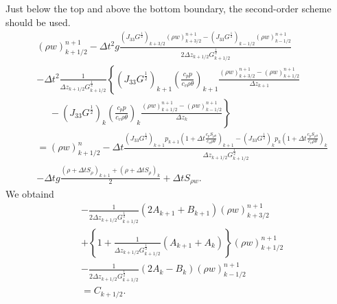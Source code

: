 Just below the top and above the bottom boundary, the second-order scheme should be used.
\begin{align}
&
  (\rho w)_{k+1/2}^{n+1}
  - \Delta t^2 g\frac{(J_{33}G^{\frac{1}{2}})_{k+3/2}(\rho w)_{k+3/2}^{n+1}-(J_{33}G^{\frac{1}{2}})_{k-1/2}(\rho w)_{k-1/2}^{n+1}}{2\Delta z_{k+1/2} G^{\frac{1}{2}}_{k+1/2}}  \nonumber\\ &
  -\Delta t^2 \frac{1}{\Delta z_{k+1/2} G^{\frac{1}{2}}_{k+1/2}}\left\{
  (J_{33}G^{\frac{1}{2}})_{k+1} \left(\frac{c_pp}{c_v\rho\theta}\right)_{k+1}\frac{(\rho w)_{k+3/2}^{n+1}-(\rho w)_{k+1/2}^{n+1}}{\Delta z_{k+1}}
  \right. \nonumber\\ & \left.\:\:\:\:\:\:
  -(J_{33}G^{\frac{1}{2}})_k \left(\frac{c_pp}{c_v\rho\theta}\right)_k\frac{(\rho w)_{k+1/2}^{n+1}-(\rho w)_{k-1/2}^{n+1}}{\Delta z_k} \right\} \nonumber\\
  &=
  (\rho w)_{k+1/2}^n -\Delta t\frac{
  (J_{33}G^{\frac{1}{2}})_{k+1} p_{k+1}\left(1+\Delta t\frac{c_pS_{\rho\theta}}{c_v\rho\theta}\right)_{k+1}
  - (J_{33}G^{\frac{1}{2}})_k p_k\left(1+\Delta t\frac{c_pS_{\rho\theta}}{c_v\rho\theta}\right)_k}{\Delta z_{k+1/2} G^{\frac{1}{2}}_{k+1/2}} \nonumber\\ &
  -\Delta t g \frac{(\rho+\Delta t S_\rho)_{k+1}+(\rho+\Delta t S_\rho)_k}{2} + \Delta t S_{\rho w}.
\end{align}
We obtaind
\begin{align}
  &- \frac{1}{2\Delta z_{k+1/2} G^{\frac{1}{2}}_{k+1/2}}(2A_{k+1} + B_{k+1}) (\rho w)_{k+3/2}^{n+1} \\
  &+ \left\{ 1 + \frac{1}{\Delta z_{k+1/2} G^{\frac{1}{2}}_{k+1/2}}(A_{k+1} + A_k)  \right\}(\rho w)_{k+1/2}^{n+1} \\
  &- \frac{1}{2\Delta z_{k+1/2} G^{\frac{1}{2}}_{k+1/2}}(2A_k -B_k) (\rho w)_{k-1/2}^{n+1} \\
  &= C_{k+1/2}.
\end{align}




